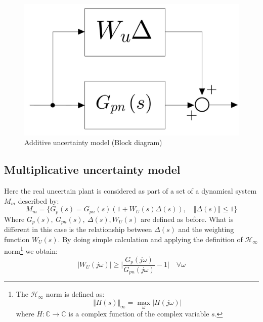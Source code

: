 \documentclass[a4paper, 12pt]{article}
\begin{document}
    \begin{figure}
        \centering
        \includegraphics[scale=0.2]{img/Additive.jpeg}
        \caption{Additive uncertainty model (Block diagram)}
    \end{figure}


    \subsection{Multiplicative uncertainty model}
    Here the real uncertain plant is considered as part of a set of a dynamical system $M_m$ described by: 
    \begin{equation}
        M_m = \{
            G_p(s) = G_{pn}(s) (1 + W_U(s) \Delta(s)), \quad 
            \Vert \Delta(s) \Vert \le 1
        \}
    \end{equation}
    Where $G_p(s), \ G_{pn}(s), \ \Delta(s), W_U(s)$ are defined as before. What is different in this case is the relationship between $\Delta(s)$ and the weighting function $W_U(s)$. By doing simple calculation and applying the definition of $\mathcal{H}_\infty$ norm\footnote{
        The $\mathcal{H}_\infty$ norm is defined as:
        \begin{equation*}
            \Vert H(s) \Vert_\infty 
        = \max_{\omega} \vert H(j\omega) \vert
        \end{equation*}
        where $H: \mathbb{C} \to \mathbb{C}$ is a complex function of the complex variable $s$.
    } we obtain:
    \begin{equation} \label{eq:cloud_m}
        \vert W_U(j\omega) \vert \ge
        \bigg\vert
            \frac{G_p(j\omega)}{G_{pn}(j\omega)}-1
        \bigg\vert \quad \forall \omega
    \end{equation}
    
\end{document}
